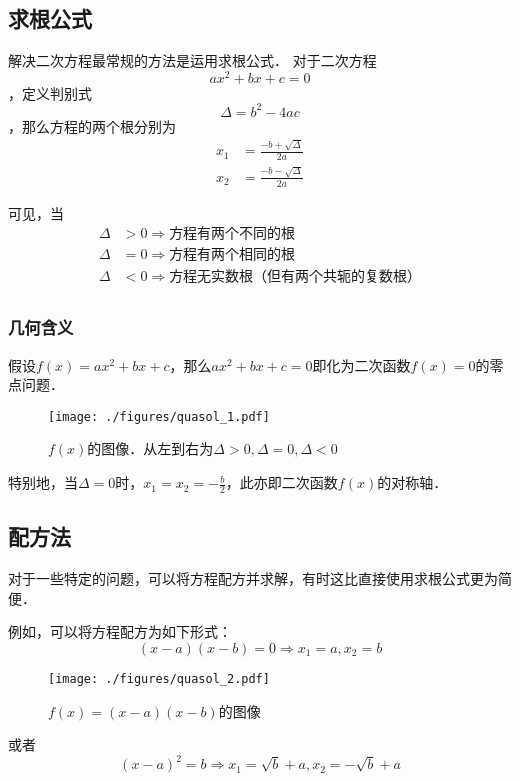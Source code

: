 
\subsection{求根公式}
解决二次方程最常规的方法是运用求根公式．
对于二次方程$$ax^2+bx+c=0$$，定义判别式$$\Delta = b^2-4ac$$，那么方程的两个根分别为$$
\begin{aligned}
x_1&=\frac{-b+\sqrt{\Delta}}{2a}\\
x_2&=\frac{-b-\sqrt{\Delta}}{2a}
\end{aligned}
$$

可见，当
$$
\begin{aligned}
\Delta &> 0 \Rightarrow \text{方程有两个不同的根}\\
\Delta &= 0 \Rightarrow \text{方程有两个相同的根}\\
\Delta &< 0 \Rightarrow \text{方程无实数根（但有两个共轭的复数根）}\\
\end{aligned}
$$

\subsubsection{几何含义}
假设$f(x)=ax^2+bx+c$，那么$ax^2+bx+c=0$即化为二次函数$f(x)=0$的零点问题．
\begin{figure}[ht]
\centering
\texttt{[image: ./figures/quasol\_1.pdf]}
\caption{$f(x)$的图像．从左到右为$\Delta > 0, \Delta = 0, \Delta < 0$} \label{quasol_fig1}
\end{figure}
特别地，当$\Delta =0$时，$x_1=x_2=-\frac{b}{2}$，此亦即二次函数$f(x)$的对称轴．

\subsection{配方法}
对于一些特定的问题，可以将方程配方并求解，有时这比直接使用求根公式更为简便．

例如，可以将方程配方为如下形式：
$$(x-a)(x-b)=0\Rightarrow x_1=a, x_2=b$$
\begin{figure}[ht]
\centering
\texttt{[image: ./figures/quasol\_2.pdf]}
\caption{$f(x)=(x-a)(x-b)$的图像} \label{quasol_fig2}
\end{figure}

或者
$$(x-a)^2=b\Rightarrow x_1=\sqrt{b}+a, x_2=-\sqrt{b}+a$$
